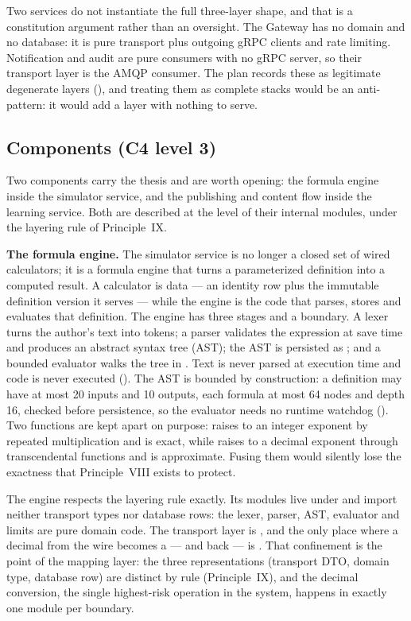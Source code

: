 Two services do not instantiate the full three-layer shape, and that is a
constitution argument rather than an oversight. The Gateway has no domain and no
database: it is pure transport plus outgoing gRPC clients and rate limiting.
Notification and audit are pure consumers with no gRPC server, so their transport
layer is the AMQP consumer. The plan records these as legitimate degenerate
layers (), and treating them as
complete stacks would be an anti-pattern: it would add a  layer with
nothing to serve.

\subsection{Components (C4 level 3)}

Two components carry the thesis and are worth opening: the formula engine inside
the simulator service, and the publishing and content flow inside the learning
service. Both are described at the level of their internal modules, under the
layering rule of Principle~IX.

\textbf{The formula engine.} The simulator service is no longer a closed set of
wired calculators; it is a formula engine that turns a parameterized definition
into a computed result. A calculator is data --- an identity row plus the
immutable definition version it serves --- while the engine is the code that
parses, stores and evaluates that definition. The engine has three stages and a
boundary. A lexer turns the author's text into tokens; a parser validates the
expression at save time and produces an abstract syntax tree (AST); the AST is
persisted as ; and a bounded evaluator walks the tree in
. Text is never parsed at execution time and code is never
executed (). The AST is
bounded by construction: a definition may have at most 20 inputs and 10 outputs,
each formula at most 64 nodes and depth 16, checked before persistence, so the
evaluator needs no runtime watchdog ().
Two functions are kept apart on purpose:  raises to an integer exponent
by repeated multiplication and is exact, while  raises to a decimal
exponent through transcendental functions and is approximate. Fusing them would
silently lose the exactness that Principle~VIII exists to protect.

The engine respects the layering rule exactly. Its modules live under
 and import neither transport types nor database rows:
the lexer, parser, AST, evaluator and limits are pure domain code. The transport
layer is , and the only place where a decimal
 from the wire becomes a  --- and back --- is
. That confinement is the point of the mapping layer:
the three representations (transport DTO, domain type, database row) are distinct
by rule (Principle~IX), and the decimal conversion, the single highest-risk
operation in the system, happens in exactly one module per boundary.

